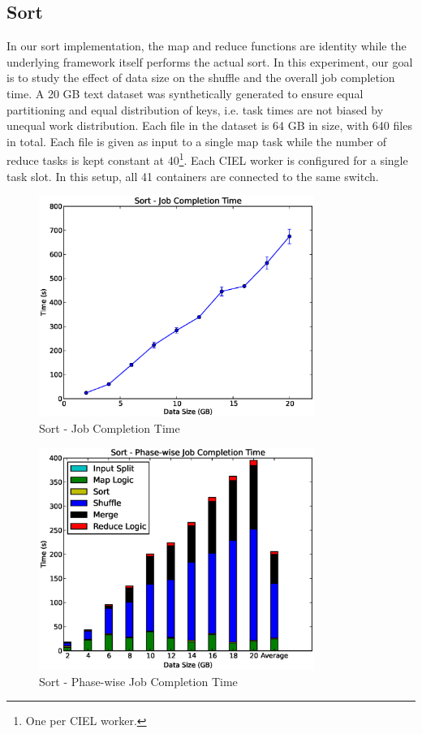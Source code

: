 \documentclass[a4paper,12pt,twoside,openright]{report}
\begin{document}
\subsection{Sort}
In our sort implementation, the map and reduce functions are identity while the
underlying framework itself performs the actual sort. In this experiment, our
goal is to study the effect of data size on the shuffle and the overall job
completion time. A 20 GB text dataset was synthetically generated to ensure
equal partitioning and equal distribution of keys, i.e. task times are not
biased by unequal work distribution. Each file in the dataset is 64 GB in size,
with 640 files in total. Each file is given as input to a single map task while
the number of reduce tasks is kept constant at 40\footnote{One per CIEL
worker.}. Each CIEL worker is configured for a single task slot. In this setup,
all 41 containers are connected to the same switch.

\begin{figure}[h!]
  \centering
    \includegraphics[width=0.8\textwidth]{sort.eps}
    \caption{Sort - Job Completion Time}
    \label{chap:eval:sec:ciel:fig:sort}
\end{figure}

\begin{figure}[h!]
  \centering
    \includegraphics[width=0.8\textwidth]{sort_phase.eps}
    \caption{Sort - Phase-wise Job Completion Time}
    \label{chap:eval:sec:ciel:fig:sortphase}
\end{figure}
\end{document}
